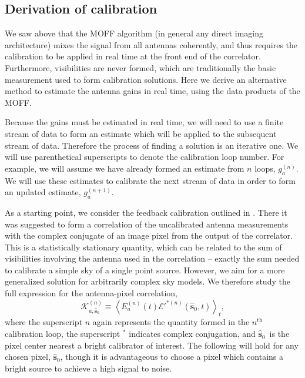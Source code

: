 \documentclass[a4paper,fleqn,usenatbib]{mnras}
\newcommand{\spix}{\ensuremath{\hat{\mathbf{s}}_{0}}}
\newcommand{\Kna}[1][n]{\ensuremath{\mathcal{K}^{(#1)}_{a,\spix}}}
\begin{document}
\subsection{Derivation of calibration}
We saw above that the MOFF algorithm (in general any direct imaging architecture) mixes the 
signal from all antennas coherently, and thus requires the calibration to be applied in real time 
at the front end of the correlator. Furthermore, visibilities are never formed, which are 
traditionally the basic measurement used to form calibration solutions. Here we derive an 
alternative method to estimate the antenna gains in real time, using the data products of the 
MOFF. 

Because the gains must be estimated in real time, we will need to use a finite stream of data to 
form an estimate which will be applied to the subsequent stream of data. Therefore the 
process of finding a solution is an iterative one. We will use parenthetical superscripts to 
denote the calibration loop number. For example, we will assume we have already formed an 
estimate from $n$ loops, $g^{(n)}_a$. We will use these estimates to calibrate the next stream 
of data in order to form an updated estimate, $g^{(n+1)}_a$.

As a starting point, we consider the feedback calibration outlined in \citealt{mor11}. There it 
was suggested to form a correlation of the uncalibrated antenna measurements with the complex conjugate of an image 
pixel from the output of the correlator. This is a statistically stationary quantity, which can be 
related to the sum of visibilities involving the antenna used in the correlation -- exactly the sum 
needed to calibrate a simple sky of a single point source. However, we aim for a more 
generalized solution for arbitrarily complex sky models. We therefore study the full expression 
for the antenna-pixel correlation,
\begin{equation}\label{eq:Cna}
\Kna \equiv \left<E_a^{(n)}(t) \mathcal{E}'^{*(n)}(\spix,t)\right>_t,
\end{equation}
where the superscript $n$ again represents the quantity formed in the $n^\mathrm{th}$ 
calibration loop, 
the superscript $^*$ indicates complex conjugation,
and \spix\, is the pixel center nearest a bright calibrator of interest. The 
following will hold for any chosen pixel, \spix, though it is advantageous to choose a pixel which 
contains a bright source to achieve a high signal to noise. 
\end{document}
